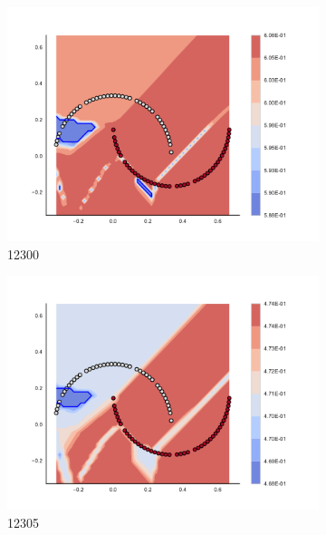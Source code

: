 \begin{figure}[h]
\begin{subfigure}[b]{0.09\textwidth}
    \includegraphics[clip, trim=2.35cm 1.75cm 4.5cm 0cm,width=\textwidth]{img/convergence/12300.pdf}
    \caption{12300}
    \label{fig:convergence_12300}
\end{subfigure}
%
\begin{subfigure}[b]{0.09\textwidth}
    \includegraphics[clip, trim=2.35cm 1.75cm 4.5cm 0cm,width=\textwidth]{img/convergence/12305.pdf}
    \caption{12305}
    \label{fig:convergence_12305}
\end{subfigure}
%
\begin{subfigure}[b]{0.09\textwidth}

\end{subfigure}
\end{figure}
